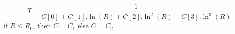 \[
T = \frac{1}{C[0] + C[1].\ln (R)  + C[2].\ln^2 (R) + C[3].\ln^3 (R) }
\]
if $R \leq R_0$, then $C=C_1$ else $C=C_2$
